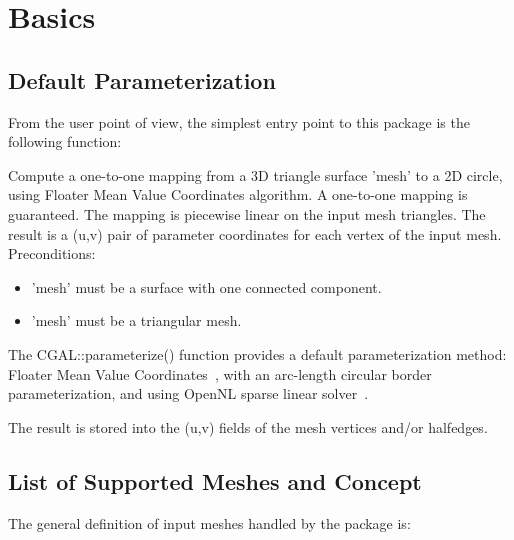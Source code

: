 \section{Basics}


\subsection{Default Parameterization}

From the user point of view, the simplest entry point to this package
is the following function:

{
Compute a one-to-one mapping from a 3D triangle surface 'mesh' to a 2D circle, using Floater Mean Value Coordinates algorithm. A one-to-one mapping is guaranteed.
The mapping is piecewise linear on the input mesh triangles. The result is a (u,v) pair of parameter coordinates for each vertex of the input mesh.
Preconditions:\begin{itemize}
\item 'mesh' must be a surface with one connected component.\item 'mesh' must be a triangular mesh.\end{itemize}
}

The CGAL::parameterize() function provides a default parameterization
method: Floater Mean Value Coordinates~\cite{cgal:f-mvc-03}, with an
arc-length circular border parameterization, and using OpenNL sparse
linear solver~\cite{cgal:l-nmdgp-05}.

The result is stored into the (u,v) fields of the mesh vertices and/or
halfedges.


\subsection{List of Supported Meshes and Concept}

The general definition of input meshes handled by the package is:

